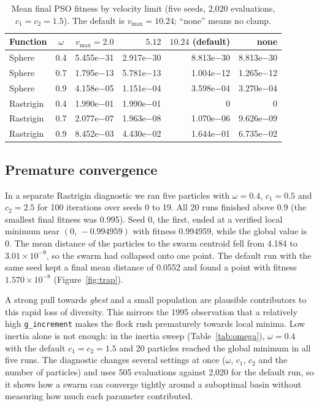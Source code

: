 \documentclass[11pt,a4paper]{article}
\newcommand{\vmax}{v_{\max}}
\newcommand{\tn}[1]{\textit{#1}}
\begin{document}
\begin{table}[ht]
\centering
\caption{Mean final PSO fitness by velocity limit (five seeds, 2,020 evaluations, $c_1=c_2=1.5$). The default is $\vmax=10.24$; ``none'' means no clamp.}\label{tab:vmax}
\small
\begin{tabular}{@{}lcrrrr@{}}
\toprule
\textbf{Function} & $\omega$ & $\vmax=2.0$ & $5.12$ & $10.24$ (default) & none\\
\midrule
Sphere & 0.4 & 5.455e$-$31 & 2.917e$-$30 & 8.813e$-$30 & 8.813e$-$30\\
Sphere & 0.7 & 1.795e$-$13 & 5.781e$-$13 & 1.004e$-$12 & 1.265e$-$12\\
Sphere & 0.9 & 4.158e$-$05 & 1.151e$-$04 & 3.598e$-$04 & 3.270e$-$04\\
Rastrigin & 0.4 & 1.990e$-$01 & 1.990e$-$01 & 0 & 0\\
Rastrigin & 0.7 & 2.077e$-$07 & 1.963e$-$08 & 1.070e$-$06 & 9.626e$-$09\\
Rastrigin & 0.9 & 8.452e$-$03 & 4.430e$-$02 & 1.644e$-$01 & 6.735e$-$02\\
\bottomrule
\end{tabular}
\end{table}

\subsection{Premature convergence}
In a separate Rastrigin diagnostic we ran five particles with $\omega=0.4$, $c_1=0.5$ and $c_2=2.5$ for 100 iterations over seeds 0 to 19. All 20 runs finished above 0.9 (the smallest final fitness was 0.995). Seed 0, the first, ended at a verified local minimum near $(0,\,-0.994959)$ with fitness 0.994959, while the global value is 0. The mean distance of the particles to the swarm centroid fell from 4.184 to $3.01\times10^{-9}$, so the swarm had collapsed onto one point. The default run with the same seed kept a final mean distance of 0.0552 and found a point with fitness $1.570\times10^{-8}$ (Figure~\ref{fig:trap}).

A strong pull towards \tn{gbest} and a small population are plausible contributors to this rapid loss of diversity. This mirrors the 1995 observation that a relatively high \texttt{g\_increment} makes the flock rush prematurely towards local minima. Low inertia alone is not enough: in the inertia sweep (Table~\ref{tab:omega}), $\omega=0.4$ with the default $c_1=c_2=1.5$ and 20 particles reached the global minimum in all five runs. The diagnostic changes several settings at once ($\omega$, $c_1$, $c_2$ and the number of particles) and uses 505 evaluations against 2,020 for the default run, so it shows how a swarm can converge tightly around a suboptimal basin without measuring how much each parameter contributed.
\end{document}
